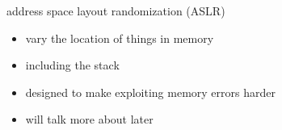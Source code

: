 \begin{frame}{address space layout randomization (ASLR)}
    \begin{itemize}
    \item vary the location of things in memory
    \item including the stack
    \item designed to make exploiting memory errors harder
    \item will talk more about later
    \end{itemize}
\end{frame}
